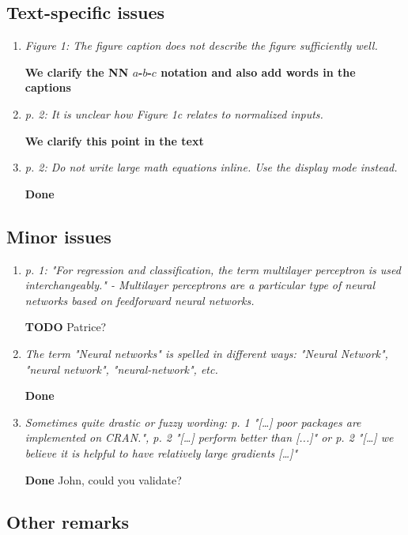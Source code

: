 \documentclass[12pt]{article}
\newcommand{\red}[1]{{\color{red}#1}}
\begin{document}
\subsection*{Text-specific issues}

\begin{enumerate}[resume]
\item \textit{Figure 1: The figure caption does not describe the figure sufficiently well.}

\textbf{We clarify the NN $a$-$b$-$c$ notation and also add words in the captions}

\item \textit{p. 2: It is unclear how Figure 1c relates to normalized inputs.}

\textbf{We clarify this point in the text}

\item \textit{p. 2: Do not write large math equations inline. Use the display mode instead.}

\textbf{Done}

\end{enumerate}

\subsection*{Minor issues}

\begin{enumerate}[resume]
\item \textit{p. 1: "For regression and classification, the term multilayer perceptron is used interchangeably." - Multilayer perceptrons are a particular type of neural networks based on feedforward neural networks.}

\textbf{TODO}
\red{Patrice?}

\item \textit{The term "Neural networks" is spelled in different ways: "Neural Network", "neural network", "neural-network", etc.}

\textbf{Done}

 
\item \textit{Sometimes quite drastic or fuzzy wording: p. 1 "[…] poor packages are implemented on CRAN.", p. 2 "[…] perform better than [...]" or p. 2 "[…] we believe it is helpful to have relatively large gradients […]"}

\textbf{Done}
\red{John, could you validate?}

\end{enumerate}

\subsection*{Other remarks}
\end{document}
